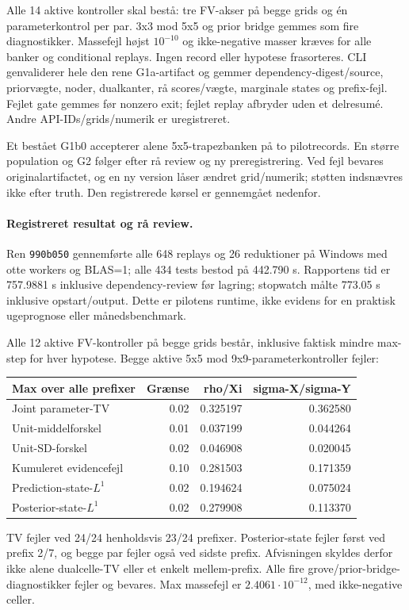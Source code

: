 Alle 14 aktive kontroller skal bestå: tre FV-akser på begge grids og én
parameterkontrol per par. 3x3 mod 5x5 og prior bridge gemmes som fire diagnostikker.
Massefejl højst \(10^{-10}\) og ikke-negative masser kræves for alle banker
og conditional replays. Ingen record eller hypotese frasorteres.
CLI genvaliderer hele den rene G1a-artifact og gemmer dependency-digest/source,
priorvægte, noder, dualkanter, rå scores/vægte, marginale states og prefix-fejl.
Fejlet gate gemmes før nonzero exit; fejlet replay afbryder uden et delresumé.
Andre API-IDs/grids/numerik er uregistreret.

Et bestået G1b0 accepterer alene 5x5-trapezbanken på to pilotrecords.
En større population og G2 følger efter rå review og ny preregistrering.
Ved fejl bevares originalartifactet, og en ny version låser ændret grid/numerik;
støtten indsnævres ikke efter truth. Den registrerede kørsel er gennemgået nedenfor.

\paragraph{Registreret resultat og rå review.}
Ren \texttt{990b050} gennemførte alle 648 replays og 26 reduktioner på Windows
med otte workers og BLAS=1; alle 434 tests bestod på 442.790 s.
Rapportens tid er 757.9881 s inklusive dependency-review før lagring;
stopwatch målte 773.05 s inklusive opstart/output. Dette er pilotens runtime,
ikke evidens for en praktisk ugeprognose eller månedsbenchmark.

Alle 12 aktive FV-kontroller på begge grids består, inklusive faktisk mindre
max-step for hver hypotese. Begge aktive 5x5 mod 9x9-parameterkontroller fejler:
\begin{center}
\begin{tabular}{lrrr}
\toprule
Max over alle prefixer & Grænse & rho/Xi & sigma-X/sigma-Y\\
\midrule
Joint parameter-TV & 0.02 & 0.325197 & 0.362580\\
Unit-middelforskel & 0.01 & 0.037199 & 0.044264\\
Unit-SD-forskel & 0.02 & 0.046908 & 0.020045\\
Kumuleret evidencefejl & 0.10 & 0.281503 & 0.171359\\
Prediction-state-\(L^1\) & 0.02 & 0.194624 & 0.075024\\
Posterior-state-\(L^1\) & 0.02 & 0.279908 & 0.113370\\
\bottomrule
\end{tabular}
\end{center}
TV fejler ved 24/24 henholdsvis 23/24 prefixer. Posterior-state fejler først
ved prefix 2/7, og begge par fejler også ved sidste prefix. Afvisningen skyldes
derfor ikke alene dualcelle-TV eller et enkelt mellem-prefix.
Alle fire grove/prior-bridge-diagnostikker fejler og bevares.
Max massefejl er \(2.4061\cdot10^{-12}\), med ikke-negative celler.

